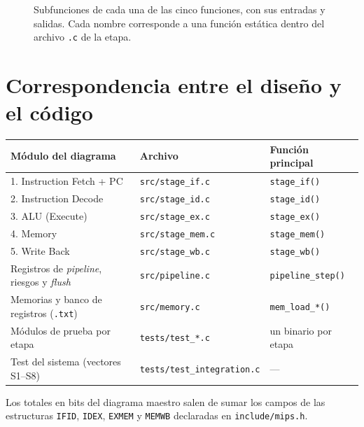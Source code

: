 \documentclass[11pt,a4paper]{article}
\begin{document}
\begin{figure}[H]
\caption{Subfunciones de cada una de las cinco funciones, con sus entradas y salidas.
Cada nombre corresponde a una función estática dentro del archivo \texttt{.c} de la etapa.}
\end{figure}

\clearpage
\section{Correspondencia entre el diseño y el código}

\begin{table}[H]
\centering\small
\begin{tabular}{@{}lll@{}}
\toprule
Módulo del diagrama & Archivo & Función principal \\
\midrule
1. Instruction Fetch + PC & \texttt{src/stage\_if.c}  & \texttt{stage\_if()} \\
2. Instruction Decode     & \texttt{src/stage\_id.c}  & \texttt{stage\_id()} \\
3. ALU (Execute)          & \texttt{src/stage\_ex.c}  & \texttt{stage\_ex()} \\
4. Memory                 & \texttt{src/stage\_mem.c} & \texttt{stage\_mem()} \\
5. Write Back             & \texttt{src/stage\_wb.c}  & \texttt{stage\_wb()} \\
\midrule
Registros de \emph{pipeline}, riesgos y \emph{flush} & \texttt{src/pipeline.c} & \texttt{pipeline\_step()} \\
Memorias y banco de registros (\texttt{.txt})        & \texttt{src/memory.c}   & \texttt{mem\_load\_*()} \\
Módulos de prueba por etapa                          & \texttt{tests/test\_*.c} & un binario por etapa \\
Test del sistema (vectores S1--S8)                   & \texttt{tests/test\_integration.c} & --- \\
\bottomrule
\end{tabular}
\end{table}

\noindent Los totales en bits del diagrama maestro salen de sumar los campos de las
estructuras \texttt{IFID}, \texttt{IDEX}, \texttt{EXMEM} y \texttt{MEMWB} declaradas en
\texttt{include/mips.h}.
\end{document}
